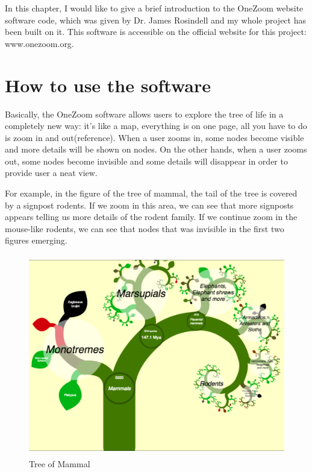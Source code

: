 \documentclass[MSc]{icldt}
\begin{document}
In this chapter, I would like to give a brief introduction to the OneZoom website software code, which was given by Dr. James Rosindell and my whole project has been built on it. This software is accessible on the official website for this project: www.onezoom.org. 

\section{How to use the software}
Basically, the OneZoom software allows users to explore the tree of life in a completely new way: it's like a map, everything is on one page, all you have to do is zoom in and out(reference). When a user zooms in, some nodes become visible and more details will be shown on nodes. On the other hands, when a user zooms out, some nodes become invisible and some details will disappear in order to provide user a neat view. 

For example, in the figure of the tree of mammal, the tail of the tree is covered by a signpost rodents. If we zoom in this area, we can see that more signposts appears telling us more details of the rodent family. If we continue zoom in the mouse-like rodents, we can see that nodes that was invisible in the first two figures emerging.

\begin{figure}[H]
  \centering
  \includegraphics [width=15cm,height=8.8cm]{Mammal}
  \caption{Tree of Mammal}
  \label{fig:mammal}
\end{figure}
\end{document}
